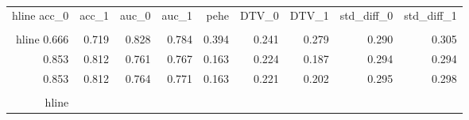 \begin{table}[h]
\centering
\caption{}
\label{wd_para_4.0_wd_159.47384643554688}
\begin{tabular}{rrrrrrrrr}
\\hline
 acc\_0 &  acc\_1 &  auc\_0 &  auc\_1 &  pehe &  DTV\_0 &  DTV\_1 &  std\_diff\_0 &  std\_diff\_1 \\
\\hline
 0.666 &  0.719 &  0.828 &  0.784 & 0.394 &  0.241 &  0.279 &       0.290 &       0.305 \\
 0.853 &  0.812 &  0.761 &  0.767 & 0.163 &  0.224 &  0.187 &       0.294 &       0.294 \\
 0.853 &  0.812 &  0.764 &  0.771 & 0.163 &  0.221 &  0.202 &       0.295 &       0.298 \\
\\hline
\end{tabular}
\end{table}

